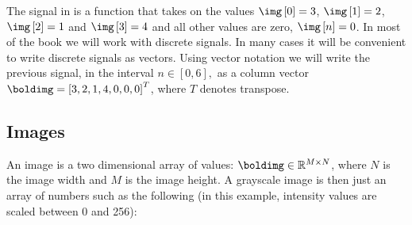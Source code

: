 %
The signal in  is a function that takes on the values $\img \left[0\right] = 3$, $\img \left[1\right] = 2$, $\img \left[2\right] = 1$ and $\img \left[3\right] = 4$ and all other values are zero, $\img \left[n\right] = 0$. In most of the book we will work with discrete signals. In many cases it will be convenient to write discrete signals as vectors. Using vector notation we will write the previous signal, in the interval $n \in \left[0,6 \right],$ as a column vector $\boldimg = \left[3, 2, 1, 4, 0, 0, 0\right]^T$, where $T$ denotes transpose.
%


\subsection{Images}

An image is a two dimensional array of values: $\boldimg \in \mathbb{R}^{M \times N}$, where $N$ is the image width and $M$ is the image height. A grayscale image is then just an array of numbers such as the following (in this example, intensity values are scaled between 0 and 256):


